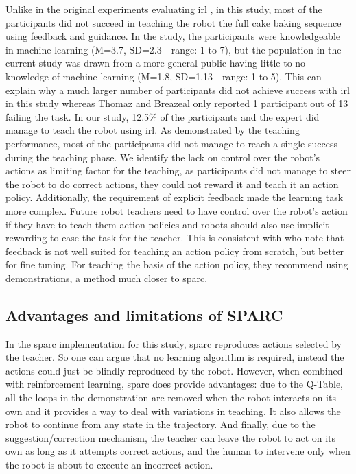 Unlike in the original experiments evaluating \gls{irl} \citep{thomaz2008teachable}, in this study, most of the participants did not succeed in teaching the robot the full cake baking sequence using feedback and guidance. In the \citet{thomaz2008teachable} study, the participants were knowledgeable in machine learning (M=3.7, SD=2.3 - range: 1 to 7), but the population in the current study was drawn from a more general public having little to no knowledge of machine learning (M=1.8, SD=1.13 - range: 1 to 5). This can explain why a much larger number of participants did not achieve success with \gls{irl} in this study whereas Thomaz and Breazeal only reported 1 participant out of 13 failing the task. In our study, 12.5\% of the participants and the expert did manage to teach the robot using \gls{irl}. As demonstrated by the teaching performance, most of the participants did not manage to reach a single success during the teaching phase. We identify the lack on control over the robot's actions as limiting factor for the teaching, as participants did not manage to steer the robot to do correct actions, they could not reward it and teach it an action policy. Additionally, the requirement of explicit feedback made the learning task more complex. Future robot teachers need to have control over the robot's action if they have to teach them action policies and robots should also use implicit rewarding to ease the task for the teacher. 
This is consistent with \cite{kaochar2011towards} who note that feedback is not well suited for teaching an action policy from scratch, but better for fine tuning. For teaching the basis of the action policy, they recommend using demonstrations, a method much closer to \gls{sparc}. 

\subsection{Advantages and limitations of SPARC}

In the \gls{sparc} implementation for this study, \gls{sparc} reproduces actions selected by the teacher. So one can argue that no learning algorithm is required, instead the actions could just be blindly reproduced by the robot. However, when combined with reinforcement learning, \gls{sparc} does provide advantages: due to the Q-Table, all the loops in the demonstration are removed when the robot interacts on its own and it provides a way to deal with variations in teaching. It also allows the robot to continue from any state in the trajectory. And finally, due to the suggestion/correction mechanism, the teacher can leave the robot to act on its own as long as it attempts correct actions, and the human to intervene only when the robot is about to execute an incorrect action. 

